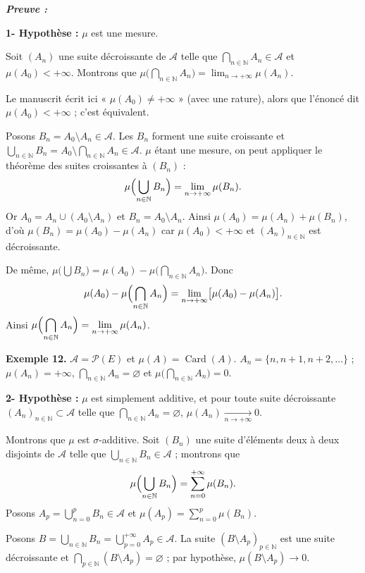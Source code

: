 \documentclass[11pt,a4paper]{article}
\newcommand{\N}{\mathbb{N}}
\newcommand{\A}{\mathscr{A}}
\newcommand{\Pp}{\mathscr{P}}
\newenvironment{preuve}{\par\textit{\textbf{Preuve :}}\par\nopagebreak[4]}{\par}
\begin{document}
\begin{preuve}\end{preuve}
\textbf{1- Hypothèse :} $\mu$ est une mesure.

Soit $(A_n)$ une suite décroissante de $\A$ telle que $\bigcap_{n\in\N}A_n\in\A$ et $\mu(A_0)<+\infty$.
Montrons que $\mu\bigl(\bigcap_{n\in\N}A_n\bigr)=\lim_{n\to+\infty}\mu(A_n)$.

\begin{note}
Le manuscrit écrit ici « $\mu(A_0)\neq+\infty$ » (avec une rature), alors que l'énoncé dit $\mu(A_0)<+\infty$ ; c'est équivalent.
\end{note}

Posons $B_n=A_0\setminus A_n\in\A$. Les $B_n$ forment une suite croissante et
$\bigcup_{n\in\N}B_n=A_0\setminus\bigcap_{n\in\N}A_n\in\A$.
$\mu$ étant une mesure, on peut appliquer le théorème des suites croissantes à $(B_n)$ :
\[
  \mu\Bigl(\bigcup_{n\in\N}B_n\Bigr)=\lim_{n\to+\infty}\mu(B_n).
\]
Or $A_0=A_n\cup(A_0\setminus A_n)$ et $B_n=A_0\setminus A_n$. Ainsi $\mu(A_0)=\mu(A_n)+\mu(B_n)$,
d'où $\mu(B_n)=\mu(A_0)-\mu(A_n)$ car $\mu(A_0)<+\infty$ et $(A_n)_{n\in\N}$ est décroissante.

De même, $\mu\bigl(\bigcup B_n\bigr)=\mu(A_0)-\mu\bigl(\bigcap_{n\in\N}A_n\bigr)$. Donc
\[
  \mu(A_0)-\mu\Bigl(\bigcap_{n\in\N}A_n\Bigr)=\lim_{n\to+\infty}\bigl[\mu(A_0)-\mu(A_n)\bigr].
\]
Ainsi $\displaystyle\mu\Bigl(\bigcap_{n\in\N}A_n\Bigr)=\lim_{n\to+\infty}\mu(A_n)$.

\textbf{\color{bleu}Exemple 12.} $\A=\Pp(E)$ et $\mu(A)=\operatorname{Card}(A)$. $A_n=\{n,n+1,n+2,\dots\}$ ; $\mu(A_n)=+\infty$,
$\bigcap_{n\in\N}A_n=\varnothing$ et $\mu\bigl(\bigcap_{n\in\N}A_n\bigr)=0$.

\textbf{2- Hypothèse :} $\mu$ est simplement additive, et pour toute suite décroissante $(A_n)_{n\in\N}\subset\A$ telle que $\bigcap_{n\in\N}A_n=\varnothing$,
$\mu(A_n)\xrightarrow[n\to+\infty]{}0$.

Montrons que $\mu$ est $\sigma$-additive. Soit $(B_n)$ une suite d'éléments deux à deux disjoints de $\A$ telle que
$\bigcup_{n\in\N}B_n\in\A$ ; montrons que
\[
  \mu\Bigl(\bigcup_{n\in\N}B_n\Bigr)=\sum_{n=0}^{+\infty}\mu(B_n).
\]
Posons $A_p=\bigcup_{n=0}^{p}B_n\in\A$ et $\mu(A_p)=\sum_{n=0}^{p}\mu(B_n)$.

Posons $B=\bigcup_{n\in\N}B_n=\bigcup_{p=0}^{+\infty}A_p\in\A$.
La suite $(B\setminus A_p)_{p\in\N}$ est une suite décroissante et $\bigcap_{p\in\N}(B\setminus A_p)=\varnothing$ ;
par hypothèse, $\mu(B\setminus A_p)\to0$.
\end{document}
